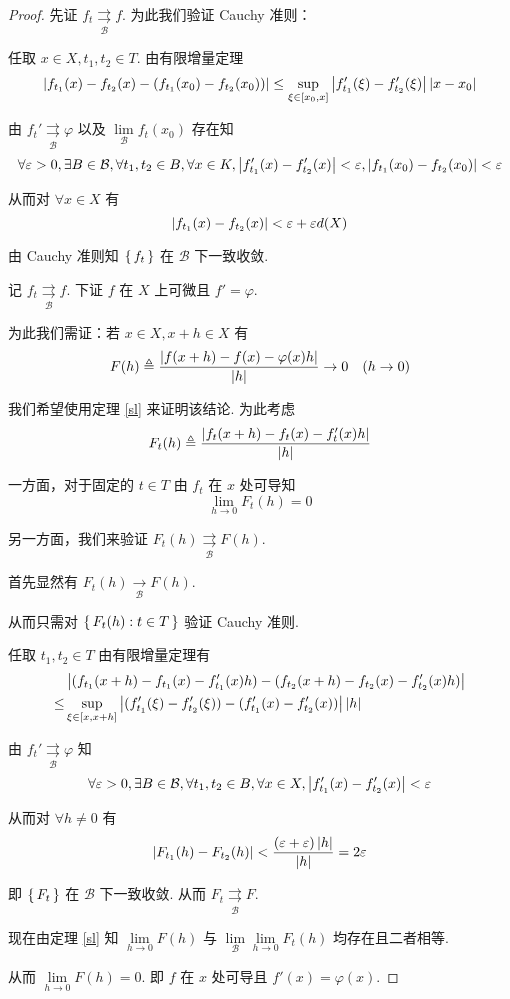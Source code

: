 \begin{proof}
    先证 $f_t\underset{\mathcal{B}}{\rightrightarrows}f$. 为此我们验证 Cauchy 准则：

    任取 $x\in X,t_1,t_2\in T$. 由有限增量定理
$$
\left\lvert{f_{t_1}(x)-f_{t_2}(x)-(f_{t_1}(x_0)-f_{t_2}(x_0))}\right\rvert\le\sup_{\xi\in[x_0,x]}\left\lvert{f_{t_1}'(\xi)-f_{t_2}'(\xi)}\right\rvert\left\lvert{x-x_0}\right\rvert
$$

    由 $f_t'\underset{\mathcal{B}}{\rightrightarrows}\varphi$ 以及 $\lim\limits_{\mathcal{B}}f_t(x_0)$ 存在知
$$
\forall\varepsilon>0,\exists B\in\mathcal{B},\forall t_1,t_2\in B,\forall x\in K,\left\lvert{f_{t_1}'(x)-f_{t_2}'(x)}\right\rvert<\varepsilon,\left\lvert{f_{t_1}(x_0)-f_{t_2}(x_0)}\right\rvert<\varepsilon
$$

    从而对 $\forall x\in X$ 有
$$
\left\lvert{f_{t_1}(x)-f_{t_2}(x)}\right\rvert<\varepsilon+\varepsilon d(X)
$$

    由 Cauchy 准则知 $\set{f_t}$ 在 $\mathcal{B}$ 下一致收敛.

    记 $f_t\underset{\mathcal{B}}{\rightrightarrows}f$. 下证 $f$ 在 $X$ 上可微且 $f'=\varphi$.

    为此我们需证：若 $x\in X,x+h\in X$ 有
$$
F(h)\triangleq\frac{\left\lvert{f(x+h)-f(x)-\varphi(x)h}\right\rvert}{\left\lvert{h}\right\rvert}\to 0\quad(h\to 0)
$$

    我们希望使用定理 \ref{sl} 来证明该结论. 为此考虑
$$
F_t(h)\triangleq\frac{\left\lvert{f_t(x+h)-f_t(x)-f_t'(x)h}\right\rvert}{\left\lvert{h}\right\rvert}
$$

    一方面，对于固定的 $t\in T$ 由 $f_t$ 在 $x$ 处可导知
$$
\lim_{h\to 0}F_t(h)=0
$$

    另一方面，我们来验证 $F_t(h)\underset{\mathcal{B}}{\rightrightarrows}F(h)$.

    首先显然有 $F_t(h)\xrightarrow[\mathcal{B}]{}F(h)$.

    从而只需对 $\set{F_t(h):t\in T}$ 验证 Cauchy 准则.

    任取 $t_1,t_2\in T$ 由有限增量定理有
$$
\begin{aligned}
    &\left\lvert{(f_{t_1}(x+h)-f_{t_1}(x)-f_{t_1}'(x)h)-(f_{t_2}(x+h)-f_{t_2}(x)-f_{t_2}'(x)h)}\right\rvert\\
    \le&\sup_{\xi\in[x,x+h]}\left\lvert{(f_{t_1}'(\xi)-f_{t_2}'(\xi))-(f_{t_1}'(x)-f_{t_2}'(x))}\right\rvert\left\lvert{h}\right\rvert
\end{aligned}
$$

    由 $f_t'\underset{\mathcal{B}}{\rightrightarrows}\varphi$ 知
$$
\forall\varepsilon>0,\exists B\in\mathcal{B},\forall t_1,t_2\in B,\forall x\in X,\left\lvert{f_{t_1}'(x)-f_{t_2}'(x)}\right\rvert<\varepsilon
$$

    从而对 $\forall h\ne 0$ 有
$$
\left\lvert{F_{t_1}(h)-F_{t_2}(h)}\right\rvert<\frac{(\varepsilon+\varepsilon)\left\lvert{h}\right\rvert}{\left\lvert{h}\right\rvert}=2\varepsilon
$$

    即 $\set{F_t}$ 在 $\mathcal{B}$ 下一致收敛. 从而 $F_t\underset{\mathcal{B}}{\rightrightarrows}F$.

    现在由定理 \ref{sl} 知 $\lim\limits_{h\to 0}F(h)$ 与 $\lim\limits_{\mathcal{B}}\lim\limits_{h\to 0}F_t(h)$ 均存在且二者相等.

    从而 $\lim\limits_{h\to 0}F(h)=0$. 即 $f$ 在 $x$ 处可导且 $f'(x)=\varphi(x)$.
\end{proof}

